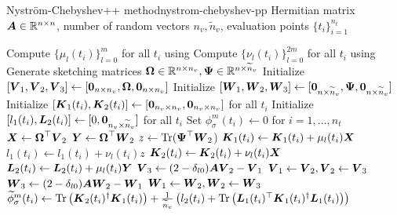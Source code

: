 \begin{algo}{Nystr\"om-Chebyshev++ method}{nystrom-chebyshev-pp}
    Hermitian matrix $\boldsymbol{A} \in \mathbb{R}^{n \times n}$, number of random vectors $n_v, \widetilde{n}_v$,
    evaluation points $\{t_i\}_{i=1}^{n_t}$
    \begin{algorithmic}[1]
        \State Compute $\{\mu_l(t_i)\}_{l=0}^m$ for all $t_i$ using 
        \State Compute $\{\nu_l(t_i)\}_{l=0}^{2m}$ for all $t_i$ using 
        \State Generate sketching matrices $\boldsymbol{\Omega} \in \mathbb{R}^{n \times n_v}, \boldsymbol{\Psi} \in \mathbb{R}^{n \times \widetilde{n}_v}$ %
        \State Initialize $[\boldsymbol{V}_1, \boldsymbol{V}_2, \boldsymbol{V}_3] \gets [\boldsymbol{0}_{n \times n_v}, \boldsymbol{\Omega}, \boldsymbol{0}_{n \times n_v}]$
        \State Initialize $[\boldsymbol{W}_1, \boldsymbol{W}_2, \boldsymbol{W}_3] \gets [\boldsymbol{0}_{n \times \widetilde{n}_v}, \boldsymbol{\Psi}, \boldsymbol{0}_{n \times \widetilde{n}_v}]$
        \State Initialize $[\boldsymbol{K}_1(t_i), \boldsymbol{K}_2(t_i)] \gets [\boldsymbol{0}_{n_v \times n_v}, \boldsymbol{0}_{n_v \times n_v}]$ for all $t_i$
        \State Initialize $[l_1(t_i), \boldsymbol{L}_2(t_i)] \gets [0, \boldsymbol{0}_{n_v \times \widetilde{n}_v}]$ for all $t_i$
        \State Set ${\phi}_{\sigma}^m(t_i) \gets 0$ for $i=1,\dots,n_t$
          \State $\boldsymbol{X} \gets \boldsymbol{\Omega}^{\top} \boldsymbol{V}_2$
          \State $\boldsymbol{Y} \gets \boldsymbol{\Omega}^{\top} \boldsymbol{W}_2$
          \State $z \gets \operatorname{Tr}(\boldsymbol{\Psi}^{\top} \boldsymbol{W}_2$)
                \State $\boldsymbol{K}_1(t_i) \gets \boldsymbol{K}_1(t_i) + \mu_l(t_i) \boldsymbol{X}$
                \State $l_1(t_i) \gets l_1(t_i) + \nu_l(t_i) z$
            \EndIf
            \State $\boldsymbol{K}_2(t_i) \gets \boldsymbol{K}_2(t_i) + \nu_l(t_i) \boldsymbol{X}$
            \State $\boldsymbol{L}_2(t_i) \gets \boldsymbol{L}_2(t_i) + \mu_l(t_i) \boldsymbol{Y}$
          \EndFor
          \State $\boldsymbol{V}_3 \gets (2 - \delta_{l0}) \boldsymbol{A} \boldsymbol{V}_2 - \boldsymbol{V}_1$ 
          \State $\boldsymbol{V}_1 \gets \boldsymbol{V}_2, \boldsymbol{V}_2 \gets \boldsymbol{V}_3$
          \State $\boldsymbol{W}_3 \gets (2 - \delta_{l0}) \boldsymbol{A} \boldsymbol{W}_2 - \boldsymbol{W}_1$ 
          \State $\boldsymbol{W}_1 \gets \boldsymbol{W}_2, \boldsymbol{W}_2 \gets \boldsymbol{W}_3$
        \EndFor
          \State $\widetilde{\phi}_{\sigma}^m(t_i) \gets \operatorname{Tr}\left( \boldsymbol{K}_2(t_i)^{\dagger}\boldsymbol{K}_1(t_i) \right) + \frac{1}{\widetilde{n}_v} \left( l_2(t_i) + \operatorname{Tr}\left( \boldsymbol{L}_1(t_i)^{\top} \boldsymbol{K}_1(t_i)^{\dagger} \boldsymbol{L}_1(t_i) \right)  \right) $
        \EndFor
    \end{algorithmic}
\end{algo}

